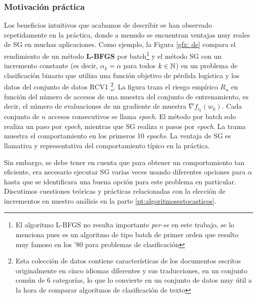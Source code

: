 \subsubsection{Motivación práctica}

Los beneficios intuitivos que acabamos de describir se han observado repetidamente en la práctica, donde a menudo se encuentran ventajas muy reales de SG en muchas aplicaciones. Como ejemplo, la Figura \ref{gfx: de} compara el rendimiento de un método \textbf{L-BFGS} por batch\footnote[1]{El algoritmo L-BFGS no resulta importante \textit{per-se} en este trabajo, se lo menciona pues es un algoritmo de tipo batch de primer orden que resulto muy famoso en los '80 para problemas de clasificaci\'on} \cite{liu:1989} \cite{nocedal:1980} y el método SG con un incremento constante (es decir, $\alpha_k = \alpha$ para todos $k \in {\mathbb{N}}$) en un problema de clasificación binario que utiliza una función objetivo de pérdida logística y los datos del conjunto de datos RCV1 \footnote[2]{Esta colecci\'on de datos contiene caracter\'isticas de los documentos escritos originalmente en cinco idiomas diferentes y sus traducciones, en un conjunto com\'un de 6 categor\'ias, lo que lo convierte en un conjunto de datos muy \'util a la hora de comparar algoritmos de clasificaci\'on de texto}. La figura traza el riesgo empírico $R_n$ en función del número de accesos de una muestra del conjunto de entrenamiento, es decir, el número de evaluaciones de un gradiente de muestra $\nabla f_{i_k}(w_k)$. Cada conjunto de $n$ accesos consecutivos se llama \textit{epoch}. El método por batch solo realiza un paso por \textit{epoch}, mientras que SG realiza $n$ pasos por \textit{epoch}. La trama muestra el comportamiento en los primeros 10 \textit{epochs}. La ventaja de SG es llamativa y representativa del comportamiento típico en la práctica. 

Sin embargo, se debe tener en cuenta que para obtener un comportamiento tan eficiente, era necesario ejecutar SG varias veces usando diferentes opciones para $\alpha$ hasta que se identificara una buena opción para este problema en particular. Discutimos cuestiones teóricas y prácticas relacionadas con la elección de incrementos en nuestro análisis en la parte \ref{pt:algoritmosestocasticos}.


